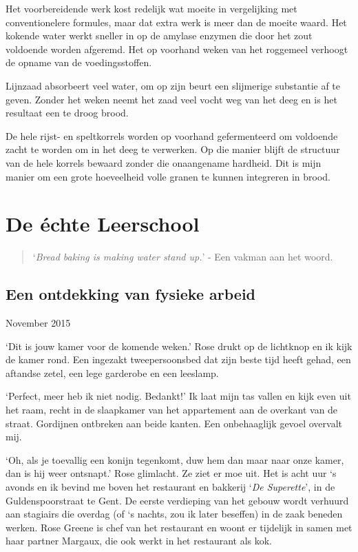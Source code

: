 \documentclass[
  11pt,
  dutch,
]{memoir}
\begin{document}
Het voorbereidende werk kost redelijk wat moeite in vergelijking met
conventionelere formules, maar dat extra werk is meer dan de moeite
waard. Het kokende water werkt sneller in op de amylase enzymen die door
het zout voldoende worden afgeremd. Het op voorhand weken van het
roggemeel verhoogt de opname van de voedingsstoffen.

Lijnzaad absorbeert veel water, om op zijn beurt een slijmerige
substantie af te geven. Zonder het weken neemt het zaad veel vocht weg
van het deeg en is het resultaat een te droog brood.

De hele rijst- en speltkorrels worden op voorhand gefermenteerd om
voldoende zacht te worden om in het deeg te verwerken. Op die manier
blijft de structuur van de hele korrels bewaard zonder die onaangename
hardheid. Dit is mijn manier om een grote hoeveelheid volle granen te
kunnen integreren in brood.

\hypertarget{de-uxe9chte-leerschool}{%
\chapter{De échte Leerschool}\label{de-uxe9chte-leerschool}}

\begin{quote}
`\emph{Bread baking is making water stand up.}' - Een vakman aan het
woord.
\end{quote}

\hypertarget{een-ontdekking-van-fysieke-arbeid}{%
\section{Een ontdekking van fysieke
arbeid}\label{een-ontdekking-van-fysieke-arbeid}}

\begin{flushright}
November 2015
\end{flushright}

`Dit is jouw kamer voor de komende weken.' Rose drukt op de lichtknop en
ik kijk de kamer rond. Een ingezakt tweepersoonsbed dat zijn beste tijd
heeft gehad, een aftandse zetel, een lege garderobe en een leeslamp.

`Perfect, meer heb ik niet nodig. Bedankt!' Ik laat mijn tas vallen en
kijk even uit het raam, recht in de slaapkamer van het appartement aan
de overkant van de straat. Gordijnen ontbreken aan beide kanten. Een
onbehaaglijk gevoel overvalt mij.

`Oh, als je toevallig een konijn tegenkomt, duw hem dan maar naar onze
kamer, dan is hij weer ontsnapt.' Rose glimlacht. Ze ziet er moe uit.
Het is acht uur `s avonds en ik bevind me boven het restaurant en
bakkerij `\emph{De Superette}', in de Guldenspoorstraat te Gent. De
eerste verdieping van het gebouw wordt verhuurd aan stagiairs die
overdag (of `s nachts, zou ik later beseffen) in de zaak beneden werken.
Rose Greene is chef van het restaurant en woont er tijdelijk in samen
met haar partner Margaux, die ook werkt in het restaurant als kok.
\end{document}
